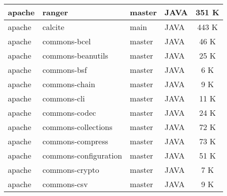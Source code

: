 \documentclass[a4paper,11pt,oneside, table]{article}
\begin{document}
\begin{table}
{\begin{tabular}{|l|l|l|l|c|}
      apache & ranger & master & JAVA & 351 K \\ \hline
      apache & calcite & main & JAVA & 443 K \\ \hline
      apache & commons-bcel & master & JAVA & 46 K \\ \hline
      apache & commons-beanutils & master & JAVA & 25 K \\ \hline
      apache & commons-bsf & master & JAVA & 6 K \\ \hline
      apache & commons-chain & master & JAVA & 9 K \\ \hline
      apache & commons-cli & master & JAVA & 11 K \\ \hline
      apache & commons-codec & master & JAVA & 24 K \\ \hline
      apache & commons-collections & master & JAVA & 72 K \\ \hline
      apache & commons-compress & master & JAVA & 73 K \\ \hline
      apache & commons-configuration & master & JAVA & 51 K \\ \hline
      apache & commons-crypto & master & JAVA & 7 K \\ \hline
      apache & commons-csv & master & JAVA & 9 K \\ \hline
      \end{tabular}
    }
  \end{table}
\end{document}
